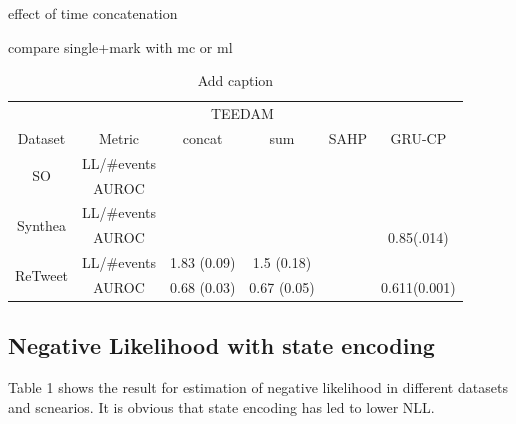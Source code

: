 \documentclass[journal,twoside,web]{ieeecolor}
\begin{document}
effect of time concatenation

compare single+mark with mc or ml


\begin{table}[htbp]
    \centering
    \caption{Add caption}
      \begin{tabular}{cccccc}
      \toprule
            &       & \multicolumn{2}{c}{TEEDAM} &       &  \\
  \cmidrule{3-4}    Dataset & Metric & concat & sum   & SAHP  & GRU-CP \\
      \midrule
      \multirow{2}[2]{*}{SO} & LL/\#events &       &       &       &  \\
            & AUROC &       &       &       &  \\
      \midrule
      \multirow{2}[2]{*}{Synthea} & LL/\#events &       &       &       &  \\
            & AUROC &       &       &       & 0.85(.014) \\
      \midrule
      \multirow{2}[2]{*}{ReTweet} & LL/\#events & 1.83 (0.09) & 1.5 (0.18) &       &  \\
            & AUROC & 0.68 (0.03) & 0.67 (0.05) &       & 0.611(0.001) \\
      \bottomrule
      \end{tabular}%
    \label{tab:addlabel}%
  \end{table}%
  
  
  





\subsection{Negative Likelihood with state encoding}

Table 1 shows the result for estimation of negative likelihood in different datasets and scnearios. It is obvious that state encoding has led to lower NLL.
\end{document}
